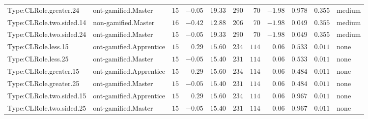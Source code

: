 \documentclass[6pt,a4paper]{article}
\begin{document}
{\begin{longtable}{llrrrrrrrrl}
Type:CLRole.greater.24&ont-gamified.Master&$15$&$-0.05$&$19.33$&$ 290$&$ 70$&$-1.98$&$0.978$&$0.355$&medium\tabularnewline
Type:CLRole.two.sided.14&non-gamified.Master&$16$&$-0.42$&$12.88$&$ 206$&$ 70$&$-1.98$&$0.049$&$0.355$&medium\tabularnewline
Type:CLRole.two.sided.24&ont-gamified.Master&$15$&$-0.05$&$19.33$&$ 290$&$ 70$&$-1.98$&$0.049$&$0.355$&medium\tabularnewline
Type:CLRole.less.15&ont-gamified.Apprentice&$15$&$ 0.29$&$15.60$&$ 234$&$114$&$ 0.06$&$0.533$&$0.011$&none\tabularnewline
Type:CLRole.less.25&ont-gamified.Master&$15$&$-0.05$&$15.40$&$ 231$&$114$&$ 0.06$&$0.533$&$0.011$&none\tabularnewline
Type:CLRole.greater.15&ont-gamified.Apprentice&$15$&$ 0.29$&$15.60$&$ 234$&$114$&$ 0.06$&$0.484$&$0.011$&none\tabularnewline
Type:CLRole.greater.25&ont-gamified.Master&$15$&$-0.05$&$15.40$&$ 231$&$114$&$ 0.06$&$0.484$&$0.011$&none\tabularnewline
\newpage
Type:CLRole.two.sided.15&ont-gamified.Apprentice&$15$&$ 0.29$&$15.60$&$ 234$&$114$&$ 0.06$&$0.967$&$0.011$&none\tabularnewline
Type:CLRole.two.sided.25&ont-gamified.Master&$15$&$-0.05$&$15.40$&$ 231$&$114$&$ 0.06$&$0.967$&$0.011$&none\tabularnewline
\hline
\end{longtable}}
\end{document}
